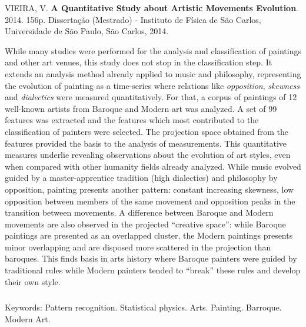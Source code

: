 \afterpage{\blankpage}

\begin{abstract2}
\vspace{-10mm}
VIEIRA, V. \textbf{A Quantitative Study about Artistic Movements Evolution}. 2014. 156p. Dissertação (Mestrado) - Instituto de Física de São Carlos, Universidade de São Paulo, São Carlos, 2014.
\vspace{15mm}

  While many studies were performed for the analysis and classification of
  paintings and other art venues, this study does not stop in the classification
  step. It extends an analysis method already applied to music and philosophy,
  representing the evolution of painting as a time-series where relations like
  \textit{opposition}, \textit{skewness} and \textit{dialectics} were measured
  quantitatively. For that, a corpus of paintings of 12 well-known artists from
  Baroque and Modern art was analyzed. A set of 99 features was extracted and
  the features which most contributed to the classification of painters were
  selected. The projection space obtained from the features provided the basis
  to the analysis of measurements. This quantitative measures underlie revealing
  observations about the evolution of art styles, even when compared with other
  humanity fields already analyzed. While music evolved guided by a
  master-apprentice tradition (high dialectics) and philosophy by opposition,
  painting presents another pattern: constant increasing skewness, low
  opposition between members of the same movement and opposition peaks in the
  transition between movements. A difference between Baroque and Modern
  movements are also observed in the projected ``creative space'': while Baroque
  paintings are presented as an overlapped cluster, the Modern paintings
  presents minor overlapping and are disposed more scattered in the projection
  than baroques. This finds basis in arts history where Baroque painters were
  guided by traditional rules while Modern painters tended to ``break'' these
  rules and develop their own style.

$\phantom{linha em branco}$\\
Keywords: Pattern recognition. Statistical physics. Arts. Painting. Barroque. Modern Art.

\end{abstract2}
